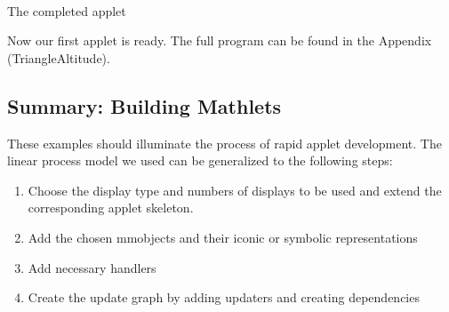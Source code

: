     \begin{center}
	\\
	{\sf The completed applet}
    \end{center}
    Now our first applet is ready. The full program can be found in the Appendix (TriangleAltitude).

	\subsection*{Summary: Building Mathlets}
	\label{building_mathlets}
	These examples should illuminate the process of rapid applet development. The linear process 
	model we used can be generalized to the following steps:
	
	\begin{enumerate}
	\item Choose the display type and numbers of displays to be used and extend the corresponding applet skeleton.
	\item Add the chosen mmobjects and their iconic or symbolic representations
	\item Add necessary handlers
	\item Create the update graph by adding updaters and creating dependencies
	\end{enumerate}

